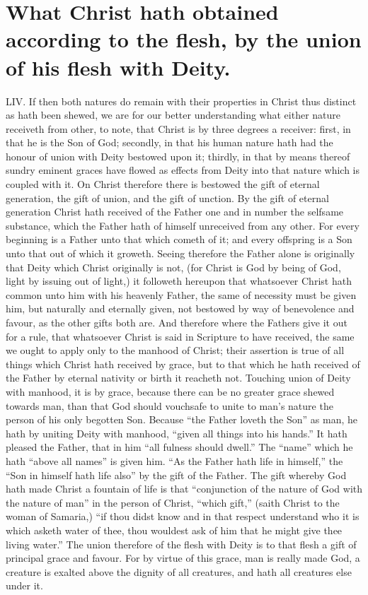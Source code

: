 \section*{What Christ hath obtained according to the flesh, by the union of his flesh with Deity.}
LIV. If then both natures do remain with their properties in Christ thus distinct as hath been shewed, we are for our better understanding what either nature receiveth from other, to note, that Christ is by three degrees a receiver: first, in that  he is the Son of God; secondly, in that his human nature hath had the honour of union with Deity bestowed upon it; thirdly, in that by means thereof sundry eminent graces have flowed as effects from Deity into that nature which is coupled with it. On Christ therefore there is bestowed the gift of eternal generation, the gift of union, and the gift of unction.
By the gift of eternal generation Christ hath received of the Father one and in number the selfsame substance, which the Father hath of himself unreceived from any other. For every beginning is a Father unto that which cometh of it; and every offspring is a Son unto that out of which it groweth. Seeing therefore the Father alone is originally that Deity which Christ originally is not, (for Christ is God by being of God, light by issuing out of light,) it followeth hereupon that whatsoever Christ hath common unto him with his heavenly Father, the same of necessity must be given him,  but naturally and eternally given, not bestowed by way of benevolence and favour, as the other gifts both are. And therefore where the Fathers give it out for a rule, that whatsoever Christ is said in Scripture to have received, the same we ought to apply only to the manhood of Christ; their assertion is true of all things which Christ hath received by grace, but to that which he hath received of the Father by eternal nativity or birth it reacheth not.
Touching union of Deity with manhood, it is by grace, because there can be no greater grace shewed towards man, than that God should vouchsafe to unite to man’s nature the person of his only begotten Son. Because “the Father loveth the Son” as man, he hath by uniting Deity with manhood, “given all things into his hands.” It hath pleased the Father, that in him “all fulness should dwell.” The “name” which he hath “above all names” is given him. “As the Father hath life in himself,” the “Son in himself hath life also” by the gift of the Father. The gift whereby God hath made Christ a fountain of life is that “conjunction of the nature of God with the nature of man” in the person of Christ, “which gift,” (saith Christ to the woman of Samaria,) “if thou didst know and in that respect understand who it is which asketh water of thee, thou wouldest ask of him that he might give thee living water.” The union therefore of the flesh with Deity is to that flesh a gift of principal grace and favour. For by virtue of this grace, man is really made God, a creature is exalted above the dignity of all creatures, and hath all creatures else under it.
